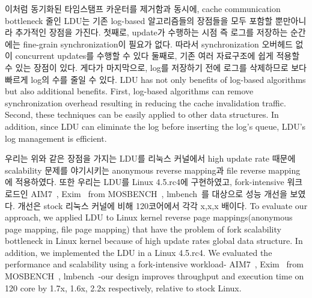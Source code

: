 \ifkor
이처럼 동기화된 타임스탬프 카운터를 제거함과 동시에, cache communication bottleneck 줄인
LDU는 기존 log-based 알고리즘들의 장점들을 모두 포함할 뿐만아니라 추가적인 장점을 가진다.
첫째로, update가 수행하는 시점 즉 로그를 저장하는 순간에는 fine-grain synchronization이 필요가 없다. 
따라서 synchronization 오버헤드 없이 concurrent updates를 수행할 수 있다
둘째로, 기존 여러 자료구조에 쉽게 적용할 수 있는 장점이 있다.
게다가 마지막으로, log를 저장하기 전에 로그를 삭제하므로 보다 빠르게 log의 수를 줄일 수 있다. 
\else
LDU has not only benefits of log-based algorithms but also additional benefits.
First, log-based algorithms can remove synchronization overhead resulting in
reducing the cache invalidation traffic.
Second, these techniques can be easily applied to other data structures.
In addition, since LDU can eliminate the log before inserting the log's queue,
LDU's log management is efficient.
\fi


\ifkor
우리는 위와 같은 장점을 가지는 LDU를 리눅스 커널에서 high update rate 때문에 scalability 문제를 야기시키는
anonymous reverse mapping과 file reverse mapping에 적용하였다.
또한 우리는 LDU를 Linux 4.5.rc4에 구현하였고, fork-intensive 워크로드인
AIM7~\cite{AIM7Benchmark}, Exim~\cite{Exim} from MOSBENCH~\cite{MOSBENCH},
lmbench~\cite{mcvoy1996lmbench}를 대상으로 성능 개선을 보였다. 개선은 stock 리눅스 커널에 비해 120코어에서
각각 x,x,x 배이다.
\else
To evaluate our approach, we applied LDU to Linux kernel reverse
page mappings(anonymous page mapping, file page mapping) that have the
problem of fork scalability bottleneck in Linux kernel because of
high update rates global data structure.
In addition, we implemented the LDU in a Linux 4.5.rc4.
We evaluated the performance and scalability using a fork-intensive workload-
AIM7~\cite{AIM7Benchmark}, Exim~\cite{Exim} from MOSBENCH~\cite{MOSBENCH},
lmbench~\cite{mcvoy1996lmbench}-our design improves throughput and execution
time on 120 core by 1.7x, 1.6x, 2.2x respectively, relative to stock Linux.
\fi


